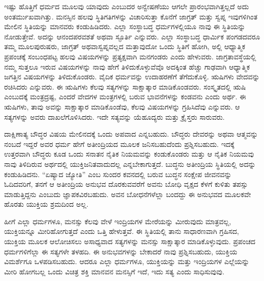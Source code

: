 ಇಷ್ಟು ಹೊತ್ತಿಗೆ ಧರ್ಮದ ಮೂಲವು ಯಾವುದು ಎಂಬುದರ ಅನ್ವೇಷಣೆಯು ಆಗಲೇ ಪ್ರಾರಂಭವಾಗಿತ್ತಲ್ಲದೆ ಅದು ಅಂತರ್ಮುಖವಾಗಿತ್ತು. ಮನಸ್ಸಿನ ಹಲವು ಸ್ಥಿತಿಗತಿಗಳನ್ನು ವಿಚಾರಿಸುತ್ತಾ ಕೊನೆಗೆ ಜಾಗ್ರತ್​ ಮತ್ತು ಸ್ವಪ್ನ ಇವುಗಳಿಗಿಂತ ಮೇಲಿನ ಸ್ಥಿತಿಯನ್ನು ಮಾನವರು ಕಂಡುಹಿಡಿದರು. ಎಲ್ಲಾ ಸಂಸ್ಥಾಬದ್ಧ ಧರ್ಮಗಳಲ್ಲಿಯೂ ನಾವು ಈ ಸ್ಥಿತಿಯನ್ನು ನೋಡುತ್ತೇವೆ. ಅದನ್ನು ಆನಂದಪರವಶತೆ ಅಥವಾ ಸ್ಫೂರ್ತಿ ಎನ್ನುವರು. ಎಲ್ಲಾ ಸಂಸ್ಥಾಬದ್ಧ ಧಾರ್ಮಿಕ ಪಂಗಡದವರೂ ತಮ್ಮ ಮೂಲಪುರುಷರು, ಜಾಗ್ರತ್​ ಅಥವಾ\break  ಸ್ವಪ್ನವಲ್ಲದ ಮತ್ತಾವುದೋ ಒಂದು ಸ್ಥಿತಿಗೆ ಹೋಗಿ, ಅಲ್ಲಿ ಆಧ್ಯಾತ್ಮಿಕ ಪ್ರಪಂಚಕ್ಕೆ ಸಂಬಂಧಪಟ್ಟ ಹಲವು ವಿಷಯಗಳನ್ನು ಪ್ರತ್ಯಕ್ಷವಾಗಿ ಮನಗಂಡರು ಎಂದು ಹೇಳುವರು. ಜಾಗ್ರತಾವಸ್ಥೆಯಲ್ಲಿ ನಮ್ಮ ಸುತ್ತಲೂ ಇರುವ ವಿಷಯಗಳನ್ನು ನಾವು ಹೇಗೆ ತಿಳಿದುಕೊಳ್ಳುವೆವೊ ಅದಕ್ಕಿಂತ ಹೆಚ್ಚು ಗಾಢವಾಗಿ ಆಧ್ಯಾತ್ಮಿಕ ಜಗತ್ತಿನ ವಿಷಯಗಳನ್ನು ತಿಳಿದುಕೊಂಡರು. ವೈದಿಕ ಧರ್ಮವನ್ನು ಉದಾಹರಣೆಗೆ ತೆಗೆದುಕೊಳ್ಳಿ. ಋಷಿಗಳು ವೇದವನ್ನು ರಚಿಸಿದರು ಎನ್ನುವರು. ಈ ಋಷಿಗಳು ಕೆಲವು ಸತ್ಯಗಳನ್ನು ಸಾಕ್ಷಾತ್ಕಾರ ಮಾಡಿಕೊಂಡವರು. ಸಂಸ್ಕೃತದಲ್ಲಿ ಋಷಿ ಎಂಬುದಕ್ಕೆ ಮಂತ್ರದ್ರಷ್ಟ, ಎಂದರೆ ವೇದಗಳ ಮಂತ್ರಗಳಲ್ಲಿ ಬರುವ ಭಾವನೆಗಳನ್ನು ಕಂಡವನು ಎಂದು ಅರ್ಥ. ಈ ಋಷಿಗಳು, ತಾವು ಅವನ್ನು ಸಾಕ್ಷಾತ್ಕಾರ ಮಾಡಿಕೊಂಡೆವು, ಕೆಲವು ವಿಷಯಗಳನ್ನು ಗ್ರಹಿಸಿದೆವು ಎನ್ನುವರು. ಆ ಸತ್ಯಗಳನ್ನು ಅವರು ದಾಖಲೆಗೊಳಿಸಿದರು. ಇದೇ ಸತ್ಯವನ್ನು ಯೆಹೂದ್ಯರು ಮತ್ತು ಕ್ರೈಸ್ತರು ಸಾರುವರು.

\vskip  0.3cm

ದಾಕ್ಷಿಣಾತ್ಯ ಬೌದ್ಧರ ವಿಷಯ ಮೇಲಿನದಕ್ಕೆ ಒಂದು ಅಪವಾದ ಎನ್ನಬಹುದು. ಬೌದ್ಧರು ದೇವರನ್ನು ಅಥವಾ ಆತ್ಮವನ್ನು ನಂಬದೆ ಇದ್ದರೆ ಅವರ ಧರ್ಮ ಹೇಗೆ ಅತೀಂದ್ರಿಯದ ಮೂಲಕ ಜನಿಸಬಹುದೆಂದು ಪ್ರಶ್ನಿಸಬಹುದು. ಇದಕ್ಕೆ ಉತ್ತರವಾಗಿ ಬೌದ್ಧರು ಕೂಡ ಒಂದು ಸನಾತನ ನೈತಿಕ ನಿಯಮವನ್ನು ಕಂಡುಕೊಂಡರು ಮತ್ತು ಆ ನೈತಿಕ ನಿಯಮವು ನಾವು ತಿಳಿದಿರುವ ಅರ್ಥದಲ್ಲಿ ಯುಕ್ತಿಜನಿತವಾದುದಲ್ಲ ಎನ್ನಬೇಕಾಗುತ್ತದೆ. ಬುದ್ಧನು ಅತೀಂದ್ರಿಯ ಸ್ಥಿತಿಯಲ್ಲಿ ಅದನ್ನು ಕಂಡುಹಿಡಿದನು. “ಏಷ್ಯಾದ ಜ್ಯೋತಿ” ಎಂಬ ಸುಂದರ ಕವನದಲ್ಲಿ ಬರುವ ಬುದ್ಧನ ಸಂಕ್ಷೇಪ ಜೀವನವನ್ನು ಓದಿದವರಿಗೆ, ತನಗೆ ಆ ಅತೀಂದ್ರಿಯ ಅನುಭವ ದೊರಕುವವರೆಗೆ ಅವನು ಬೋಧಿ ವೃಕ್ಷದ ಕೆಳಗೆ ಕುಳಿತು ತಪಸ್ಸು ಮಾಡುತ್ತಿದ್ದನು ಎಂಬುದು ಜ್ಞಾಪಕವಿರಬಹುದು. ಅವನ ಬೋಧನೆಗಳೆಲ್ಲಾ ಬಂದದ್ದು ಈ ಅನುಭವದ ಮೂಲಕವೇ ಹೊರತು ಯುಕ್ತಿಯ ಶ್ರಮದಿಂದ ಅಲ್ಲ.

\vskip  0.3cm

ಹೀಗೆ ಎಲ್ಲಾ ಧರ್ಮಗಳೂ, ಮನಸ್ಸು ಕೆಲವು ವೇಳೆ ಇಂದ್ರಿಯಗಳ ಮೇರೆಯನ್ನು ಮೀರುವುದು ಮಾತ್ರವಲ್ಲ, ಯುಕ್ತಿಯನ್ನೂ ಮೀರಿಹೋಗುತ್ತದೆ ಎಂದು ಒತ್ತಿ ಹೇಳುತ್ತವೆ. ಈ ಸ್ಥಿತಿಯಲ್ಲಿ ತಾನು ಸಾಧಾರಣವಾಗಿ ಗ್ರಹಿಸದ, ಯುಕ್ತಿಯ ಮೂಲಕ ಆಲೋಚಿಸಲು ಅಸಾಧ್ಯವಾದ ಸತ್ಯಗಳನ್ನು ಮನಸ್ಸು ಸಾಕ್ಷಾತ್ಕಾರ ಮಾಡಿಕೊಳ್ಳುವುದು. ಪ್ರಪಂಚದ ಧರ್ಮಗಳಿಗೆಲ್ಲಾ ಈ ಸತ್ಯಗಳೇ ತಳಹದಿ. ಈ ಅನುಭವಗಳನ್ನು ಬೇಕಾದರೆ ನಾವು ಪ್ರಶ್ನಿಸಬಹುದು, ಯುಕ್ತಿಯ ವಿಮರ್ಶೆಗೂ ಒಳಪಡಿಸಬಹುದು. ಆದರೂ ಎಲ್ಲಾ ಧರ್ಮಗಳೂ, ಯುಕ್ತಿಯನ್ನು ಮತ್ತು ಇಂದ್ರಿಯಗಳ ಎಲ್ಲೆಯನ್ನು ಮೀರಿ ಹೋಗಬಲ್ಲ ಒಂದು ವಿಚಿತ್ರ ಶಕ್ತಿ ಮಾನವನ ಮನಸ್ಸಿಗೆ ಇದೆ, ಇದು ಸತ್ಯ ಎಂದು ಸಾಧಿಸುವುವು.

\vskip  0.1cm

